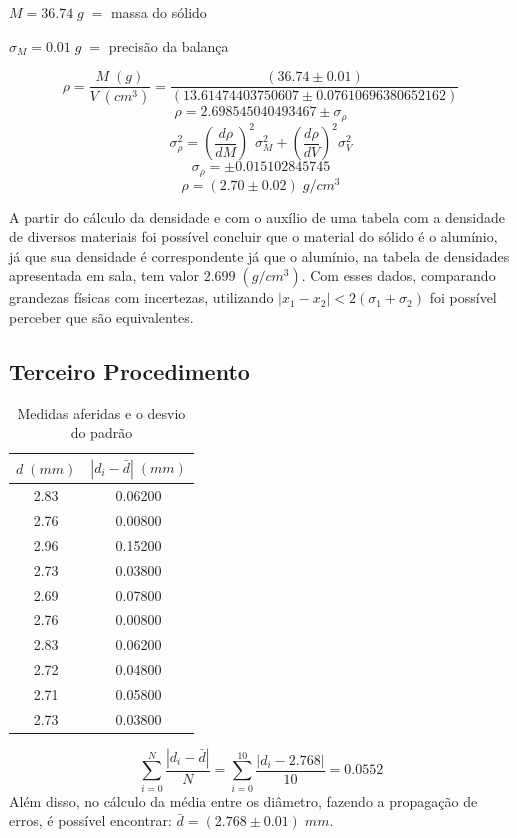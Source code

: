 \documentclass{article}
\begin{document}
$M = 36.74\;g\; = $ massa do sólido

$\sigma_M = 0.01\;g\; = $ precisão da balança

\[\rho = \frac{M\;(g)}{V\;(cm^3)} = \frac{(36.74\pm0.01)}{(13.61474403750607\pm0.07610696380652162)}\]
\[\rho = 2.698545040493467 \pm \sigma_\rho\]
\[\sigma_\rho^2 = \left(\frac{d\rho}{dM}\right)^2\sigma_M^2+\left(\frac{d\rho}{dV}\right)^2\sigma_V^2\]
\[\sigma_\rho =\pm 0.015102845745\]
\[\rho = (2.70 \pm 0.02)\;g/cm^3\]

A partir do cálculo da densidade e com o auxílio de uma tabela com a densidade de diversos materiais foi possível concluir que o material do sólido é o alumínio, já que sua densidade é correspondente já que o alumínio, na tabela de densidades apresentada em sala, tem valor $2.699\;(g/cm^3)$. Com esses dados, comparando grandezas físicas com incertezas, utilizando $|x_1-x_2|<2(\sigma_1+\sigma_2)$ foi possível perceber que são equivalentes.
\subsection{Terceiro Procedimento}

\begin{table}[!ht]
    \centering
    \begin{tabular}{c|c}
        $d\;(mm)$ & $|d_i-\bar{d}|\;(mm)$ \\\hline
        2.83 & 0.06200\\
        2.76 & 0.00800\\
        2.96 & 0.15200\\
        2.73 & 0.03800\\
        2.69 & 0.07800\\
        2.76 & 0.00800\\
        2.83 & 0.06200\\
        2.72 & 0.04800\\
        2.71 & 0.05800\\
        2.73 & 0.03800\\
    \end{tabular}
    \caption{Medidas aferidas e o desvio do padrão}
    \label{tab:my_label}
\end{table}
\[\sum_{i=0}^N \frac{|d_i-\bar{d}|}{N}=\sum_{i=0}^{10} \frac{|d_i-2.768|}{10}=0.0552\]
\indent
Além disso, no cálculo da média entre os diâmetro, fazendo a propagação de erros, é possível encontrar: $\bar{d} = (2.768 \pm 0.01)\;mm$.
\end{document}
